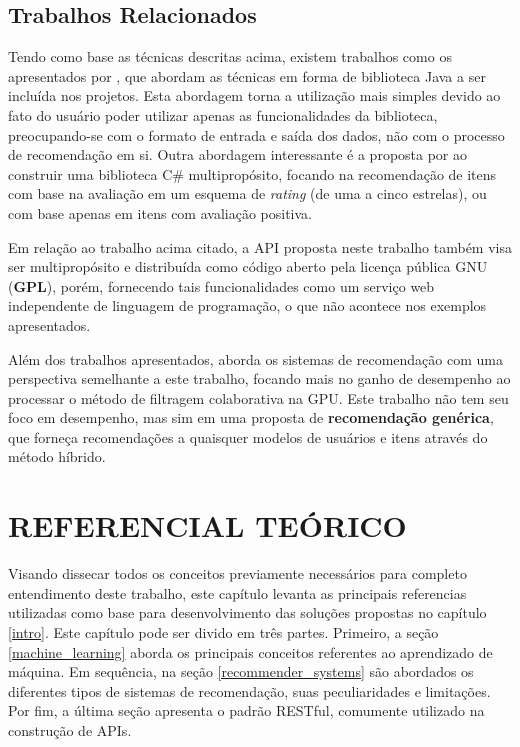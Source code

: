 \documentclass[12pt, openright, oneside, a4paper, brazil]{abntex2}
\begin{document}
\section{Trabalhos Relacionados} \label{related_work}

Tendo como base as técnicas descritas acima, existem trabalhos como os apresentados por , que abordam as técnicas em forma de biblioteca Java a ser incluída nos projetos. Esta abordagem torna a utilização mais simples devido ao fato do usuário poder utilizar apenas as funcionalidades da biblioteca, preocupando-se com o formato de entrada e saída dos dados, não com o processo de recomendação em si. Outra abordagem interessante é a proposta por  ao construir uma biblioteca C\# multipropósito, focando na recomendação de itens com base na avaliação em um esquema de \textit{rating} (de uma a cinco estrelas), ou com base apenas em itens com avaliação positiva.

Em relação ao trabalho acima citado, a API proposta neste trabalho também visa ser multipropósito e distribuída como código aberto pela licença pública GNU (\textbf{GPL}), porém, fornecendo tais funcionalidades como um serviço web independente de linguagem de programação, o que não acontece nos exemplos apresentados.

Além dos trabalhos apresentados,  aborda os sistemas de recomendação com uma perspectiva semelhante a este trabalho, focando mais no ganho de desempenho ao processar o método de filtragem colaborativa na GPU. Este trabalho não tem seu foco em desempenho, mas sim em uma proposta de \textbf{recomendação genérica}, que forneça recomendações a quaisquer modelos de usuários e itens através do método híbrido.

%
%

\cleardoublepage

\chapter{REFERENCIAL TEÓRICO}

Visando dissecar todos os conceitos previamente necessários para completo entendimento deste trabalho, este capítulo levanta as principais referencias utilizadas como base para desenvolvimento das soluções propostas no capítulo \ref{intro}. Este capítulo pode ser divido em três partes. Primeiro, a seção \ref{machine_learning} aborda os principais conceitos referentes ao aprendizado de máquina. Em sequência, na seção \ref{recommender_systems} são abordados os diferentes tipos de sistemas de recomendação, suas peculiaridades e limitações. Por fim, a última seção apresenta o padrão RESTful, comumente utilizado na construção de APIs.
\end{document}
